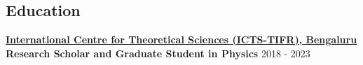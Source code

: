 \documentclass[11pt, margin, centered, letterpaper]{res}
\begin{document}
\begin{resume}
\begin{comment}
			\section{Projects}
			\begin{itemize}[leftmargin=*]
				\item \textbf{Aditya Vijaykumar}, MV Saketh, Sumit Kumar, Parameswaran Ajith, Tirthankar Roy Choudhury.\\
				\textit{Probing the cosmological large-scale structure using gravitational-wave observations} \\
				\textit{(manuscript under LIGO PnP review, to be submitted to arXiv soon)}
				\\
				\item \textbf{Aditya Vijaykumar}, Shasvath Kapadia, Parameswaran Ajith.\\
				\textit{Constraining the time-variation of the Gravitational constant using gravitational-wave observations of binary neutron stars} \\
				\textit{(manuscript under LIGO PnP review, to be submitted to arXiv soon)}
				\\
				\item \textbf{Aditya Vijaykumar}, Nathan Johnson-McDaniel, Rahul Kashyap, Arunava Mukherjee, Parameswaran Ajith.\\	
				\textit{Constraints on Black Hole Mimickers from the Gravitational-wave Transient Catalog (GWTC) -1 }
				\\
				\item Apratim Ganguly, \textbf{Aditya Vijaykumar}, Abhirup Ghosh, Parameswaran Ajith.\\	
				\textit{Probing General Relativity from the consistency of inspiral and merger-ringdown of Binary Black Holes}
				
				
			\end{itemize}
			
		\end{comment}
		
		\section{Education}
		\textbf{\href{https://www.icts.res.in/}{International Centre for Theoretical Sciences (ICTS-TIFR), Bengaluru}}\\
		\textbf{Research Scholar and Graduate Student in Physics} \hfill 2018 - 2023
		

\end{resume}
\end{document}
